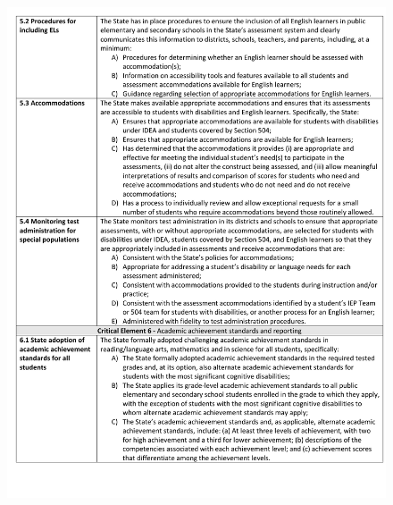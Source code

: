 \documentclass[]{article}
\begin{document}
\begin{figure}
\centering
\includegraphics{Figures/peer_rev/PeerReview5.pdf}
\caption{}
\end{figure}

\newpage
\end{document}
